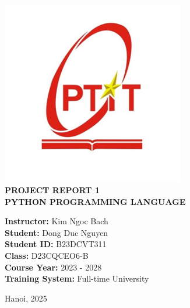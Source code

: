 \documentclass[12pt]{report}
\begin{document}
\begin{titlepage}
    \includegraphics[width=8cm]{logo.png}\\
    \vspace{1cm}
{\Large \textbf{PROJECT REPORT 1}}\\[0.5cm] %
{\LARGE \textbf{PYTHON PROGRAMMING LANGUAGE}}\\ %
    \vfill
    \begin{flushleft}
    \hspace{2.5cm}\textbf{Instructor:} \hspace{2.85cm} Kim Ngoc Bach \\ %
    \hspace{2.5cm}\textbf{Student:} \hspace{3.3cm} Dong Duc Nguyen\\ %
    \hspace{2.5cm}\textbf{Student ID:} \hspace{2.7cm} B23DCVT311\\ %
   \hspace{2.5cm}\textbf{Class:} \hspace{3.9cm} D23CQCEO6-B\\ %
    \hspace{2.5cm}\textbf{Course Year:} \hspace{2.4cm} 2023 - 2028 \\ %
    \hspace{2.5cm}\textbf{Training System:} \hspace{1.6cm} Full-time University\\ %
    \end{flushleft}
    \vfill
    {\large Hanoi, 2025} %
\end{titlepage}
\end{document}
